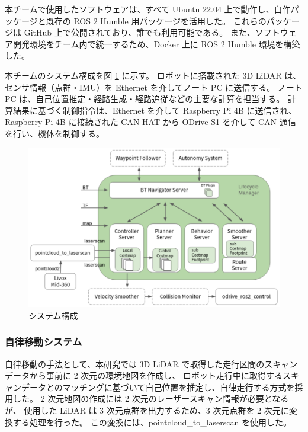 \documentclass[twocolumn,9pt]{jsproceedings}
\begin{document}
本チームで使用したソフトウェアは、すべて Ubuntu 22.04 上で動作し、自作パッケージと既存の ROS 2 Humble 用パッケージを活用した。
これらのパッケージは GitHub 上で公開されており、誰でも利用可能である。
また、ソフトウェア開発環境をチーム内で統一するため、Docker 上に ROS 2 Humble 環境を構築した。

本チームのシステム構成を図 \ref{fig:shinsotu_system_diagram} に示す。
ロボットに搭載された 3D LiDAR は、センサ情報（点群・IMU）を Ethernet を介してノート PC に送信する。
ノート PC は、自己位置推定・経路生成・経路追従などの主要な計算を担当する。
計算結果に基づく制御指令は、Ethernet を介して Raspberry Pi 4B に送信され、
Raspberry Pi 4B に接続された CAN HAT から ODrive S1 を介して CAN 通信を行い、機体を制御する。

\begin{figure}[h]
  \begin{center}
    \includegraphics[width=1.0\linewidth]{figs/shinsotu_system_diagram.pdf}
    \caption{システム構成 \cite{nav2_docs}}
    \label{fig:shinsotu_system_diagram}
  \end{center}
\end{figure}


\subsubsection{自律移動システム}

自律移動の手法として、本研究では 3D LiDAR で取得した走行区間のスキャンデータから事前に 2 次元の環境地図を作成し、
ロボット走行中に取得するスキャンデータとのマッチングに基づいて自己位置を推定し、自律走行する方式を採用した。
2 次元地図の作成には 2 次元のレーザースキャン情報が必要となるが、
使用した LiDAR は 3 次元点群を出力するため、3 次元点群を 2 次元に変換する処理を行った。
この変換には、pointcloud\_to\_laserscan \cite{pcl_lsc} を使用した。
\end{document}
